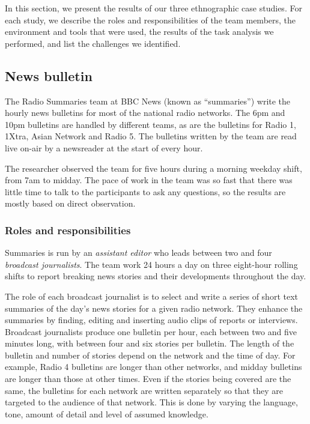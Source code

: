 In this section, we present the results of our three ethnographic case studies. For each study, we describe the roles
and responsibilities of the team members, the environment and tools that were used, the results of the task analysis we
performed, and list the challenges we identified.


\subsection{News bulletin}\label{sec:news}
The Radio Summaries team at BBC News (known as ``summaries'') write the hourly news bulletins for most of the national
radio networks. The 6pm and 10pm bulletins are handled by different teams, as are the bulletins for Radio 1, 1Xtra,
Asian Network and Radio 5.  The bulletins written by the team are read live on-air by a newsreader at the start of
every hour.

The researcher observed the team for five hours during a morning weekday shift, from 7am to midday. The pace of work in
the team was so fast that there was little time to talk to the participants to ask any questions, so the results are
mostly based on direct observation.

\subsubsection{Roles and responsibilities}\label{sec:news-roles}
Summaries is run by an \textit{assistant editor} who leads between two and four \textit{broadcast journalists}. The
team work 24 hours a day on three eight-hour rolling shifts to report breaking news stories and their developments
throughout the day.

The role of each broadcast journalist is to select and write a series of short text summaries of the day's news stories
for a given radio network.  They enhance the summaries by finding, editing and inserting audio clips of reports
or interviews.  Broadcast journalists produce one bulletin per hour, each between two and five minutes long, with between
four and six stories per bulletin.  The length of the bulletin and number of stories depend on the network and the time
of day. For example, Radio 4 bulletins are longer than other networks, and midday bulletins are longer than those at
other times. Even if the stories being covered are the same, the bulletins for each network are written separately so
that they are targeted to the audience of that network.  This is done by varying the language, tone, amount of detail
and level of assumed knowledge.

